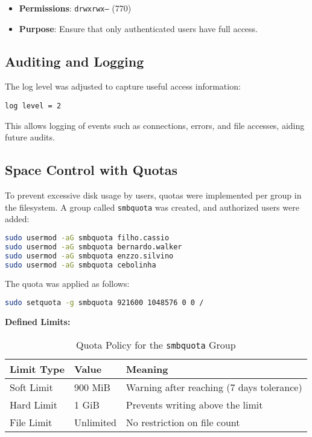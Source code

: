 \documentclass[12pt]{report}
\begin{document}
\begin{itemize}
    \item \textbf{Permissions}: \texttt{drwxrwx---} (770)
    \item \textbf{Purpose}: Ensure that only authenticated users have full access.
\end{itemize}

\subsection*{Auditing and Logging}

The log level was adjusted to capture useful access information:

\begin{lstlisting}[caption={Log Configuration for Auditing}]
log level = 2
\end{lstlisting}

This allows logging of events such as connections, errors, and file accesses, aiding future audits.

\subsection*{Space Control with Quotas}

To prevent excessive disk usage by users, quotas were implemented per group in the filesystem. A group called \texttt{smbquota} was created, and authorized users were added:

\begin{lstlisting}[language=bash, caption={Adding users to smbquota group}]
sudo usermod -aG smbquota filho.cassio
sudo usermod -aG smbquota bernardo.walker
sudo usermod -aG smbquota enzzo.silvino
sudo usermod -aG smbquota cebolinha
\end{lstlisting}

The quota was applied as follows:

\begin{lstlisting}[language=bash, caption={Applying quota to smbquota group}]
sudo setquota -g smbquota 921600 1048576 0 0 /
\end{lstlisting}

\textbf{Defined Limits:}

\begin{table}[h]
\centering
\begin{tabular}{|l|l|l|}
\hline
\textbf{Limit Type} & \textbf{Value} & \textbf{Meaning} \\
\hline
Soft Limit          & 900 MiB        & Warning after reaching (7 days tolerance) \\
Hard Limit          & 1 GiB          & Prevents writing above the limit \\
File Limit          & Unlimited      & No restriction on file count \\
\hline
\end{tabular}
\caption{Quota Policy for the \texttt{smbquota} Group}
\label{tab:samba-quotas}
\end{table}
\end{document}
